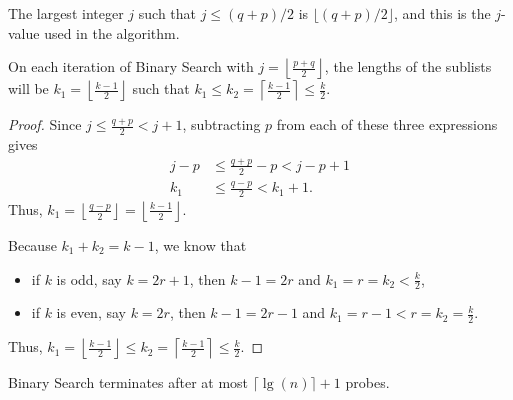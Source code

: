         The largest integer \( j \) such that \( j \leq (q + p)/2 \) is \( \lfloor (q + p)/2 \rfloor \), and this is the \( j \)-value used in the algorithm.
        \begin{theorem} \label{sublistlen}
            On each iteration of Binary Search with \( j = \left\lfloor \frac{p + q}{2} \right\rfloor \), the lengths of the sublists will be \( k_1 = \left\lfloor \frac{k - 1}{2} \right\rfloor \) such that \( k_1 \leq k_2 = \left\lceil \frac{k - 1}{2} \right\rceil \leq \frac{k}{2} \).
            \end{theorem}
            
            \begin{proof}
            Since \( j \leq \frac{q + p}{2} < j + 1 \), subtracting \( p \) from each of these three expressions gives
            \begin{align*}
            j - p &\leq \frac{q + p}{2} - p < j - p + 1 \\
            k_1 &\leq \frac{q - p}{2} < k_1 + 1.
            \end{align*}
            Thus, \( k_1 = \left\lfloor \frac{q - p}{2} \right\rfloor = \left\lfloor \frac{k - 1}{2} \right\rfloor \).
            
            Because \( k_1 + k_2 = k - 1 \), we know that
            \begin{itemize}
            \item if \( k \) is odd, say \( k = 2r + 1 \), then \( k - 1 = 2r \) and \( k_1 = r = k_2 < \frac{k}{2} \),
            \item if \( k \) is even, say \( k = 2r \), then \( k - 1 = 2r - 1 \) and \( k_1 = r - 1 < r = k_2 = \frac{k}{2} \).
            \end{itemize}
            Thus, \( k_1 = \left\lfloor \frac{k - 1}{2} \right\rfloor \leq k_2 = \left\lceil \frac{k - 1}{2} \right\rceil \leq \frac{k}{2} \).
            \end{proof}

            \begin{theorem}
                Binary Search terminates after at most \(\lceil \lg(n) \rceil + 1\) probes.
                \end{theorem}
                
